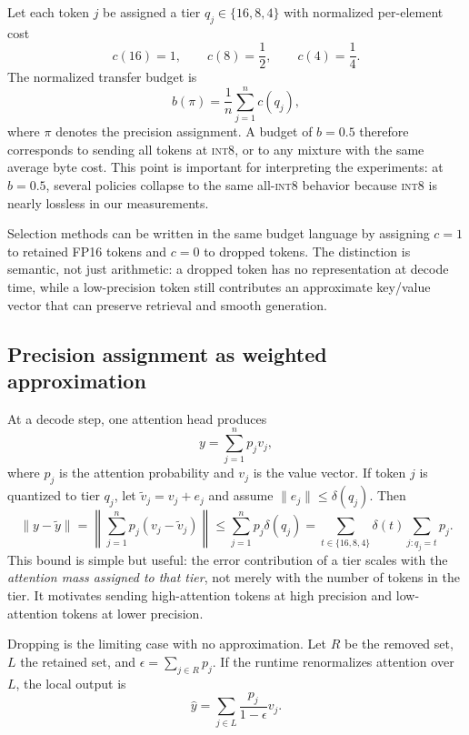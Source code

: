 \documentclass[11pt]{article}
\newcommand{\budget}{b}
\newcommand{\intviii}{\textsc{int8}}
\theoremstyle{plain}
\theoremstyle{definition}
\begin{document}
Let each token $j$ be assigned a tier $q_j\in\{16,8,4\}$ with normalized per-element cost
\begin{equation}
 c(16)=1,\qquad c(8)=\frac{1}{2},\qquad c(4)=\frac{1}{4}.
\end{equation}
The normalized transfer budget is
\begin{equation}
  \budget(\pi)=\frac{1}{n}\sum_{j=1}^n c(q_j),
  \label{eq:budget}
\end{equation}
where $\pi$ denotes the precision assignment.  A budget of $\budget=0.5$ therefore corresponds to sending all tokens at \intviii{}, or to any mixture with the same average byte cost.  This point is important for interpreting the experiments: at $\budget=0.5$, several policies collapse to the same all-\intviii{} behavior because \intviii{} is nearly lossless in our measurements.

Selection methods can be written in the same budget language by assigning $c=1$ to retained FP16 tokens and $c=0$ to dropped tokens.  The distinction is semantic, not just arithmetic: a dropped token has no representation at decode time, while a low-precision token still contributes an approximate key/value vector that can preserve retrieval and smooth generation.

\subsection{Precision assignment as weighted approximation}
At a decode step, one attention head produces
\begin{equation}
  y = \sum_{j=1}^{n} p_j v_j,
  \label{eq:attention-output}
\end{equation}
where $p_j$ is the attention probability and $v_j$ is the value vector.  If token $j$ is quantized to tier $q_j$, let $\tilde v_j=v_j+e_j$ and assume $\|e_j\|\le \delta(q_j)$.  Then
\begin{equation}
  \|y-\tilde y\|
  =\left\|\sum_{j=1}^{n}p_j(v_j-\tilde v_j)\right\|
  \le \sum_{j=1}^{n}p_j\delta(q_j)
  =\sum_{t\in\{16,8,4\}} \delta(t)\sum_{j:q_j=t}p_j .
  \label{eq:quant-bound}
\end{equation}
This bound is simple but useful: the error contribution of a tier scales with the \emph{attention mass assigned to that tier}, not merely with the number of tokens in the tier.  It motivates sending high-attention tokens at high precision and low-attention tokens at lower precision.

Dropping is the limiting case with no approximation.  Let $R$ be the removed set, $L$ the retained set, and $\epsilon=\sum_{j\in R}p_j$.  If the runtime renormalizes attention over $L$, the local output is
\begin{equation}
  \hat y=\sum_{j\in L}\frac{p_j}{1-\epsilon}v_j .
\end{equation}
\end{document}
